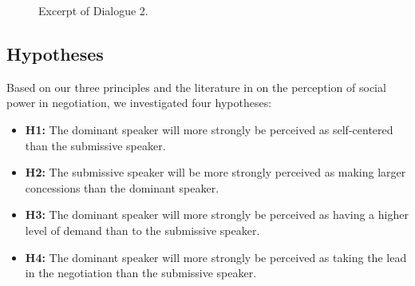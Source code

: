 \documentclass{llncs}
\begin{document}
	
	\begin{figure}
		
		\caption{\label{fig:ex-dialogue}Excerpt of Dialogue 2.}
	\end{figure}
			\vspace{-1em} 
	\subsection{Hypotheses}
		\vspace{-.5em} 
	Based on our three principles and the literature in on the perception of social power in negotiation, we investigated four hypotheses:
	\vspace{-1.5em} 
	\begin{itemize}
		\item  \textbf{H1:} The dominant speaker will more strongly be perceived as self-centered than the submissive speaker.  
		
		\item \textbf{H2:} The submissive speaker will be more strongly perceived as making larger concessions than the dominant speaker.
		
		\item \textbf{H3:}  The dominant speaker will more strongly be perceived as having a higher level of demand than to the submissive speaker.
		
		\item \textbf{H4:}  The dominant speaker will more strongly be perceived as taking the lead in the negotiation than the submissive speaker.
		
	\end{itemize}
	
\end{document}
